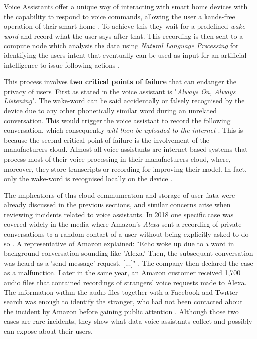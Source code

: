 Voice Assistants offer a unique way of interacting with smart home devices with the capability to respond to voice commands, allowing the user a hands-free operation of their smart home \cite{SHPA-10.1145/3412383}. To achieve this they wait for a predefined \textit{wake-word} and record what the user says after that. This recording is then sent to a compute node which analysis the data using \textit{Natural Language Processing} for identifying the users intent that eventually can be used as input for an artificial intelligence to issue following actions \cite{SHPA-10.1145/3412383}.

This process involves \textbf{two critical points of failure} that can endanger the privacy of users. First as stated in \cite{SHPA-10.1145/3412383} the voice assistant is "\textit{Always On, Always Listening}". The wake-word can be said accidentally or falsely recognised by the device due to any other phonetically similar word during an unrelated conversation. This would trigger the voice assistant to record the following conversation, which consequently \textit{will then be uploaded to the internet} \cite{SHPA-10.1145/3412383}. This is because the second critical point of failure is the involvement of the manufacturers cloud. Almost all voice assistants are internet-based systems that process most of their voice processing in their manufacturers cloud, where, moreover, they store transcripts or recording for improving their model. In fact, only the wake-word is recognised locally on the device \cite{SHPA-10.1145/3412383}\cite{BertkoChris2017HSH:}.

The implications of this cloud communication and storage of user data were already discussed in the previous sections, and similar concerns arise when reviewing incidents related to voice assistants. In 2018 one specific case was covered widely in the media where Amazon's \textit{Alexa} sent a recording of private conversations to a random contact of a user without being explicitly asked to do so \cite{Horton2018AlexaRecordsConversation}. A representative of Amazon explained: "Echo woke up due to a word in background conversation sounding like 'Alexa.' Then, the subsequent conversation was heard as a 'send message' request. [...]" \cite{Horton2018AlexaRecordsConversation}. The company then declared the case as a malfunction. Later in the same year, an Amazon customer received 1,700 audio files that contained recordings of strangers' voice requests made to Alexa. The information within the audio files together with a Facebook and Twitter search was enough to identify the stranger, who had not been contacted about the incident by Amazon before gaining public attention \cite{Ingber2018AlexaAudioFiles}. Although those two cases are rare incidents, they show what data voice assistants collect and possibly can expose about their users.

